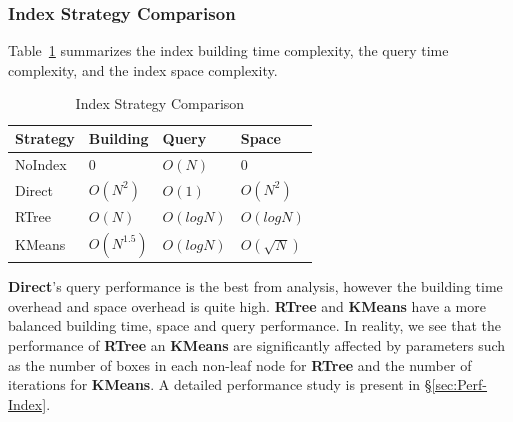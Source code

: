 \documentclass{sig-alternate}
\begin{document}
\subsubsection{Index Strategy Comparison}
Table~\ref{tb:index-comparison} summarizes the index building time complexity, 
the query time complexity, and the index space complexity.

\begin{table}[ht]
\begin{center}
    \caption{Index Strategy Comparison}
    \begin{scriptsize}
    \begin{tabular}{ | p{1.75cm} | p{1.75cm} | p{1.75cm} | p{1.75cm} |}
    \hline
    Strategy & Building & Query & Space \\ \hline \hline
    NoIndex & 0 & $O(N)$ & 0 \\ \hline
    Direct & $O(N^2)$ & $O(1)$ & $O(N^2)$ \\ \hline
    RTree & $O(N)$ & $O(logN)$ & $O(logN)$ \\ \hline
    KMeans & $O(N^{1.5})$ & $O(logN)$ & $O(\sqrt{N})$ \\ \hline
    \end{tabular}
    \end{scriptsize}
    \label{tb:index-comparison}
\end{center}   
\end{table}

{\bf Direct}'s query performance is the best from analysis, however the building time overhead and space overhead is quite high.
{\bf RTree} and {\bf KMeans} have a more balanced building time, space and query performance.
In reality, we see that the performance of {\bf RTree} an {\bf KMeans} are significantly affected by parameters such as the
number of boxes in each non-leaf node for {\bf RTree} and the number of iterations for {\bf KMeans}.
A detailed performance study is present in \S\ref{sec:Perf-Index}.

\end{document}

